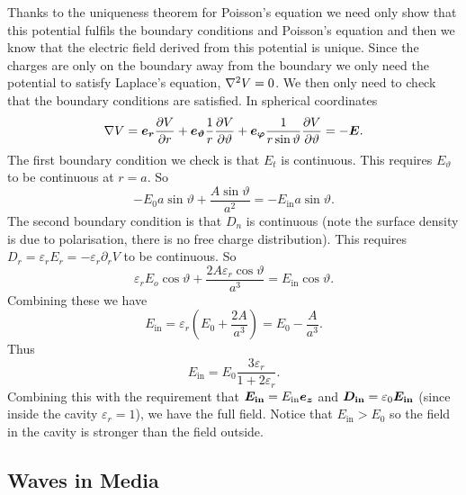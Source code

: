     Thanks to the uniqueness theorem for Poisson's equation we need only show that this potential fulfils the boundary conditions and Poisson's equation and then we know that the electric field derived from this potential is unique.
    Since the charges are only on the boundary away from the boundary we only need the potential to satisfy Laplace's equation, \(\nabla^2 V = 0\).
    We then only need to check that the boundary conditions are satisfied.
    In spherical coordinates
    \[\nabla V = \bm{e_{r}}\pdv{V}{r} + \bm{e_{\vartheta}}\frac{1}{r}\pdv{V}{\vartheta} + \bm{e_{\varphi}}\frac{1}{r\sin\vartheta}\pdv{V}{\vartheta} = -\bm{E}.\]
    The first boundary condition we check is that \(E_t\) is continuous.
    This requires \(E_\vartheta\) to be continuous at \(r = a\).
    So
    \[-E_0a\sin\vartheta + \frac{A\sin\vartheta}{a^2} = -E_{\text{in}}a\sin\vartheta.\]
    The second boundary condition is that \(D_n\) is continuous (note the surface density is due to polarisation, there is no free charge distribution).
    This requires \(D_r = \varepsilon_rE_r = -\varepsilon_r\partial_rV\) to be continuous.
    So
    \[\varepsilon_rE_o\cos\vartheta + \frac{2A\varepsilon_r\cos\vartheta}{a^3} = E_{\text{in}}\cos\vartheta.\]
    Combining these we have
    \[E_{\text{in}} = \varepsilon_r\left(E_0 + \frac{2A}{a^3}\right) = E_0 - \frac{A}{a^3}.\]
    Thus
    \[E_{\text{in}} = E_0\frac{3\varepsilon_r}{1 + 2\varepsilon_r}.\]
    Combining this with the requirement that \(\bm{E_{\mathrm{in}}} = E_{\mathrm{in}}\bm{e_{z}}\) and \(\bm{D_{\mathrm{in}}} = \varepsilon_0\bm{E_{\mathrm{in}}}\) (since inside the cavity \(\varepsilon_r = 1\)), we have the full field.
    Notice that \(E_{\text{in}} > E_0\) so the field in the cavity is stronger than the field outside.
    
    \subsection{Waves in Media}
